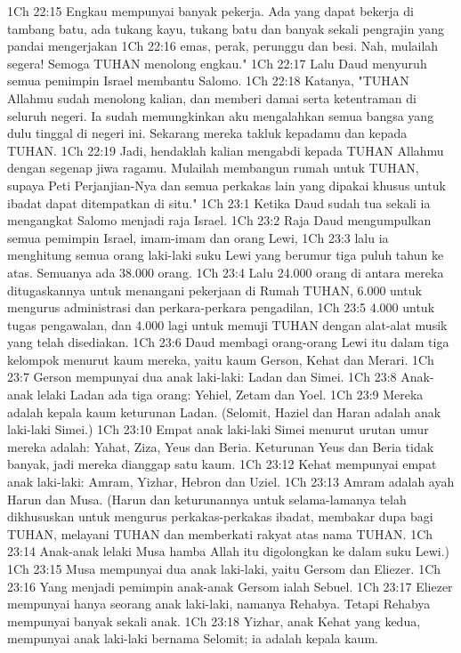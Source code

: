 1Ch 22:15  Engkau mempunyai banyak pekerja. Ada yang dapat bekerja di tambang batu, ada tukang kayu, tukang batu dan banyak sekali pengrajin yang pandai mengerjakan
1Ch 22:16  emas, perak, perunggu dan besi. Nah, mulailah segera! Semoga TUHAN menolong engkau."
1Ch 22:17  Lalu Daud menyuruh semua pemimpin Israel membantu Salomo.
1Ch 22:18  Katanya, "TUHAN Allahmu sudah menolong kalian, dan memberi damai serta ketentraman di seluruh negeri. Ia sudah memungkinkan aku mengalahkan semua bangsa yang dulu tinggal di negeri ini. Sekarang mereka takluk kepadamu dan kepada TUHAN.
1Ch 22:19  Jadi, hendaklah kalian mengabdi kepada TUHAN Allahmu dengan segenap jiwa ragamu. Mulailah membangun rumah untuk TUHAN, supaya Peti Perjanjian-Nya dan semua perkakas lain yang dipakai khusus untuk ibadat dapat ditempatkan di situ."
1Ch 23:1  Ketika Daud sudah tua sekali ia mengangkat Salomo menjadi raja Israel.
1Ch 23:2  Raja Daud mengumpulkan semua pemimpin Israel, imam-imam dan orang Lewi,
1Ch 23:3  lalu ia menghitung semua orang laki-laki suku Lewi yang berumur tiga puluh tahun ke atas. Semuanya ada 38.000 orang.
1Ch 23:4  Lalu 24.000 orang di antara mereka ditugaskannya untuk menangani pekerjaan di Rumah TUHAN, 6.000 untuk mengurus administrasi dan perkara-perkara pengadilan,
1Ch 23:5  4.000 untuk tugas pengawalan, dan 4.000 lagi untuk memuji TUHAN dengan alat-alat musik yang telah disediakan.
1Ch 23:6  Daud membagi orang-orang Lewi itu dalam tiga kelompok menurut kaum mereka, yaitu kaum Gerson, Kehat dan Merari.
1Ch 23:7  Gerson mempunyai dua anak laki-laki: Ladan dan Simei.
1Ch 23:8  Anak-anak lelaki Ladan ada tiga orang: Yehiel, Zetam dan Yoel.
1Ch 23:9  Mereka adalah kepala kaum keturunan Ladan. (Selomit, Haziel dan Haran adalah anak laki-laki Simei.)
1Ch 23:10  Empat anak laki-laki Simei menurut urutan umur mereka adalah: Yahat, Ziza, Yeus dan Beria. Keturunan Yeus dan Beria tidak banyak, jadi mereka dianggap satu kaum.
1Ch 23:12  Kehat mempunyai empat anak laki-laki: Amram, Yizhar, Hebron dan Uziel.
1Ch 23:13  Amram adalah ayah Harun dan Musa. (Harun dan keturunannya untuk selama-lamanya telah dikhususkan untuk mengurus perkakas-perkakas ibadat, membakar dupa bagi TUHAN, melayani TUHAN dan memberkati rakyat atas nama TUHAN.
1Ch 23:14  Anak-anak lelaki Musa hamba Allah itu digolongkan ke dalam suku Lewi.)
1Ch 23:15  Musa mempunyai dua anak laki-laki, yaitu Gersom dan Eliezer.
1Ch 23:16  Yang menjadi pemimpin anak-anak Gersom ialah Sebuel.
1Ch 23:17  Eliezer mempunyai hanya seorang anak laki-laki, namanya Rehabya. Tetapi Rehabya mempunyai banyak sekali anak.
1Ch 23:18  Yizhar, anak Kehat yang kedua, mempunyai anak laki-laki bernama Selomit; ia adalah kepala kaum.
